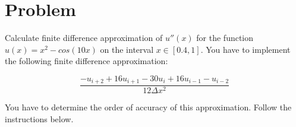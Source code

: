\documentclass[12pt,letterpaper]{article}
\begin{document}

\section*{Problem}
Calculate finite difference approximation of $u''(x)$ for the function $u(x) = x^2 - cos(10x)$ on the interval $x \in [0.4,1]$. You have to implement the following finite difference approximation:

\begin{equation*}
	\frac{-u_{i+2} + 16u_{i+1}-30u_i+16u_{i-1} - u_{i-2}}{12\Delta x^2}
\end{equation*}

You have to determine the order of accuracy of this approximation. Follow the instructions below.\\
\end{document}
